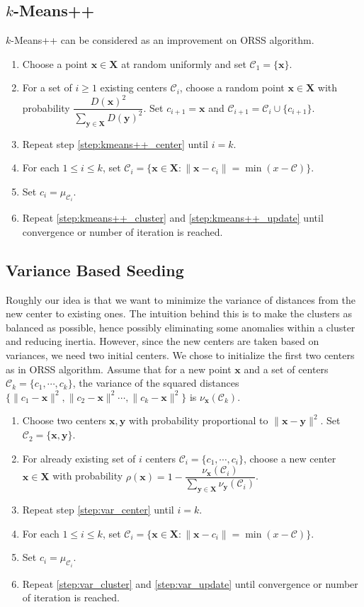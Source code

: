 \documentclass[twoside, 11pt]{article}
\newcommand{\x}{\mathbf{x}}
\newcommand{\X}{\mathbf{X}}
\newcommand{\y}{\mathbf{y}}
\newcommand{\C}{\mathcal{C}}
\begin{document}
	\subsection{$k$-Means++}
	$k$-Means++ \citep{kmeans++} can be considered as an improvement on ORSS algorithm.
		\begin{enumerate}[i]
			\item Choose a point $\x\in\X$ at random uniformly and set $\C_1=\{\x\}$.
			\item For a set of $i\geq1$ existing centers $\C_i$, choose a random point $\x\in\X$ with probability $\dfrac{D(\x)^2}{\sum_{\y\in\X}D(\y)^2}$. Set $c_{i+1}=\x$ and $\C_{i+1}=\C_i\cup\{c_{i+1}\}$.\label{step:kmeans++_center}
			\item Repeat step \eqref{step:kmeans++_center} until $i=k$.
			\item For each $1\leq i\leq k$, set $\C_i=\{\x\in\X:\|\x-c_i\|=\min(x-\C)\}$.\label{step:kmeans++_cluster}
			\item Set $c_i=\mu_{\C_i}$.\label{step:kmeans++_update}
			\item Repeat \eqref{step:kmeans++_cluster} and \eqref{step:kmeans++_update} until convergence or number of iteration is reached.\label{step:kmeans++_repeat}
		\end{enumerate}
	\subsection{Variance Based Seeding}
	Roughly our idea is that we want to minimize the variance of distances from the new center to existing ones. The intuition behind this is to make the clusters as balanced as possible, hence possibly eliminating some anomalies within a cluster and reducing inertia. However, since the new centers are taken based on variances, we need two initial centers. We chose to initialize the first two centers as in ORSS algorithm. Assume that for a new point $\x$ and a set of centers $\C_k=\{c_1,\cdots,c_k\}$, the variance of the squared distances $\{\| c_1-\x\|^2,\|c_2-\x\|^2\cdots,\| c_k-\x\|^2\}$ is $\nu_\x(\C_k)$.
		\begin{enumerate}[i]
			\item Choose two centers $\x,\y$ with probability proportional to $\|\x-\y\|^2$. Set $\C_2=\{\x,\y\}$.
			\item For already existing set of $i$ centers $\mathcal{C}_i=\{c_1,\cdots,c_i\}$, choose a new center $\x\in\X$ with probability $\rho(\x)=1-\dfrac{\nu_\x(\C_i)}{\sum_{\y\in\X}\nu_\y(\C_i)}$.\label{step:var_center}
			\item Repeat step \eqref{step:var_center} until $i=k$.
			\item For each $1\leq i\leq k$, set $\C_i=\{\x\in\X:\|\x-c_i\|=\min(x-\C)\}$.\label{step:var_cluster}
			\item Set $c_i=\mu_{\C_i}$.\label{step:var_update}
			\item Repeat \eqref{step:var_cluster} and \eqref{step:var_update} until convergence or number of iteration is reached.
		\end{enumerate}
\end{document}
